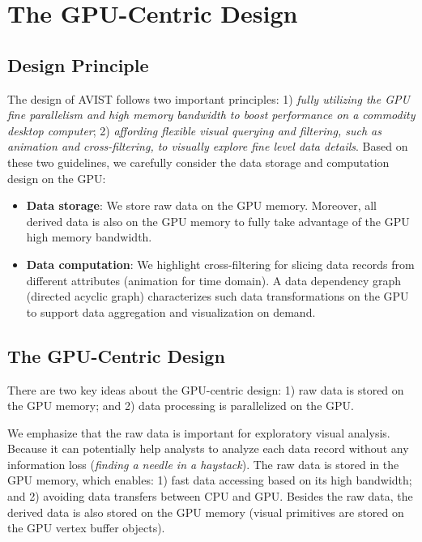 \section{The GPU-Centric Design}
\subsection{Design Principle}
The design of AVIST follows two important principles: 1) \textit{fully utilizing the GPU  fine parallelism and high memory bandwidth to boost performance on a commodity desktop computer}; 2) \textit{affording flexible visual querying and filtering, such as animation and cross-filtering, to visually explore fine level data details}. Based on these two guidelines, we carefully consider the data storage and computation design on the GPU:
\begin{itemize}
\item  \textbf{Data storage}:  We store  raw data on the GPU memory. Moreover, all derived data is also on the GPU memory to fully take advantage of the GPU high memory bandwidth.


\item \textbf{Data computation}: We highlight cross-filtering  for slicing data records from different attributes (animation for time domain). A data dependency graph (directed acyclic graph) characterizes such data transformations on the GPU to support data aggregation and visualization on demand.

\end{itemize}

\subsection{The GPU-Centric Design}

There are two key ideas about the GPU-centric design: 1)  raw data is stored on the GPU memory; and 2) data processing is parallelized on the GPU.

We emphasize that the raw data is important for exploratory visual analysis. Because it can potentially help analysts to analyze each data record without any information loss (\textit{finding a needle in a haystack}).  The raw data is stored in the GPU memory, which enables: 1) fast data accessing based on its high bandwidth; and 2) avoiding data transfers between CPU and GPU. Besides the raw data,  the derived data is also stored on the GPU memory (visual primitives are stored on the GPU vertex buffer objects). 


